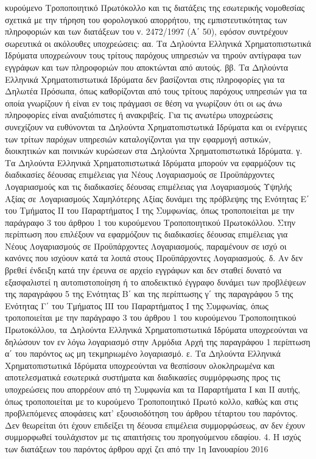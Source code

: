 \documentclass[a4paper,oneside, 10pt]{book}
\begin{document}
κυρούμενο Τροποποιητικό Πρωτόκολλο και τις διατάξεις της εσωτερικής νομοθεσίας σχετικά με την τήρηση του φορολογικού απορρήτου, της εμπιστευτικότητας των πληροφοριών και των διατάξεων του ν. 2472/1997 (A΄ 50), εφόσον συντρέχουν σωρευτικά οι ακόλουθες υποχρεώσεις:  αα. Τα Δηλούντα Ελληνικά Χρηματοπιστωτικά Ιδρύματα υποχρεώνουν τους τρίτους παρόχους υπηρεσιών να τηρούν αντίγραφα των εγγράφων και των πληροφοριών που αποκτώνται από αυτούς.  ββ. Τα Δηλούντα Ελληνικά Χρηματοπιστωτικά Ιδρύματα δεν βασίζονται στις πληροφορίες για τα Δηλωτέα Πρόσωπα, όπως καθορίζονται από τους τρίτους παρόχους υπηρεσιών για τα οποία γνωρίζουν ή είναι εν τοις πράγμασι σε θέση να γνωρίζουν ότι οι ως άνω πληροφορίες είναι αναξιόπιστες ή ανακριβείς.  Για τις ανωτέρω υποχρεώσεις συνεχίζουν να ευθύνονται τα Δηλούντα Χρηματοπιστωτικά Ιδρύματα και οι ενέργειες των τρίτων παρόχων υπηρεσιών καταλογίζονται για την εφαρμογή αστικών, διοικητικών και ποινικών κυρώσεων στα Δηλούντα Χρηματοπιστωτικά Ιδρύματα. γ. Τα Δηλούντα Ελληνικά Χρηματοπιστωτικά Ιδρύματα μπορούν να εφαρμόζουν τις διαδικασίες δέουσας επιμέλειας για Νέους Λογαριασμούς σε Προϋπάρχοντες Λογαριασμούς και τις διαδικασίες δέουσας επιμέλειας για Λογαριασμούς Υψηλής Αξίας σε Λογαριασμούς Χαμηλότερης Αξίας δυνάμει της πρόβλεψης της Ενότητας Ε΄ του Τμήματος ΙΙ του Παραρτήματος Ι της Συμφωνίας, όπως τροποποιείται με την παράγραφο 3 του άρθρου 1 του κυρούμενου Τροποποιητικού Πρωτοκόλλου. Στην περίπτωση που επιλέξουν να εφαρμόζουν τις διαδικασίες δέουσας επιμέλειας για Νέους Λογαριασμούς σε Προϋπάρχοντες Λογαριασμούς, παραμένουν σε ισχύ οι κανόνες που ισχύουν κατά τα λοιπά στους Προϋπάρχοντες Λογαριασμούς.  δ. Αν δεν βρεθεί ένδειξη κατά την έρευνα σε αρχείο εγγράφων και δεν σταθεί δυνατό να εξασφαλιστεί η αυτοπιστοποίηση ή το αποδεικτικό έγγραφο δυνάμει των προβλέψεων της παραγράφου 5 της Ενότητας Β΄ και της περίπτωσης γ΄ της παραγράφου 5 της Ενότητας Γ΄ του Τμήματος ΙΙΙ του Παραρτήματος Ι της Συμφωνίας, όπως τροποποιείται με την παράγραφο 3 του άρθρου 1 του κυρούμενου Τροποποιητικού Πρωτοκόλλου, τα Δηλούντα Ελληνικά Χρηματοπιστωτικά Ιδρύματα υποχρεούνται να δηλώσουν τον εν λόγω λογαριασμό στην Αρμόδια Αρχή της παραγράφου 1 περίπτωση α΄ του παρόντος ως μη τεκμηριωμένο λογαριασμό.  ε. Τα Δηλούντα Ελληνικά Χρηματοπιστωτικά Ιδρύματα υποχρεούνται να θεσπίσουν ολοκληρωμένα και αποτελεσματικά εσωτερικά συστήματα και διαδικασίες συμμόρφωσης προς τις υποχρεώσεις που απορρέουν από τη Συμφωνία και τα Παραρτήματα Ι και ΙΙ αυτής, όπως τροποποιείται με το κυρούμενο Τροποποιητικό Πρωτό    κολλο, καθώς και στις προβλεπόμενες αποφάσεις κατ’ εξουσιοδότηση του άρθρου τέταρτου του παρόντος. Δεν θεωρείται ότι έχουν επιδείξει τη δέουσα επιμέλεια συμμορφώσεως, αν δεν έχουν συμμορφωθεί τουλάχιστον με τις απαιτήσεις του προηγούμενου εδαφίου.  4. Η ισχύς των διατάξεων του παρόντος άρθρου αρχί ζει από την 1η Ιανουαρίου 2016
\end{document}
